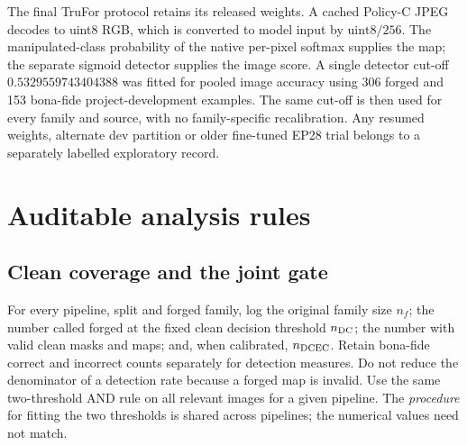 The final TruFor protocol retains its released weights. A cached Policy-C JPEG decodes to uint8 RGB, which is converted to model input by $\mathrm{uint8}/256$. The manipulated-class probability of the native per-pixel softmax supplies the map; the separate sigmoid detector supplies the image score. A single detector cut-off $0.5329559743404388$ was fitted for pooled image accuracy using 306 forged and 153 bona-fide project-development examples. The same cut-off is then used for every family and source, with no family-specific recalibration. Any resumed weights, alternate dev partition or older fine-tuned EP28 trial belongs to a separately labelled exploratory record.

\section{Auditable analysis rules}
\label{app:method-analysis}

\subsection{Clean coverage and the joint gate}

For every pipeline, split and forged family, log the original family size $n_f$; the number called forged at the fixed clean decision threshold $n_{\rm DC}$; the number with valid clean masks and maps; and, when calibrated, $n_{\rm DCEC}$. Retain bona-fide correct and incorrect counts separately for detection measures. Do not reduce the denominator of a detection rate because a forged map is invalid. Use the same two-threshold AND rule on all relevant images for a given pipeline. The \emph{procedure} for fitting the two thresholds is shared across pipelines; the numerical values need not match.

